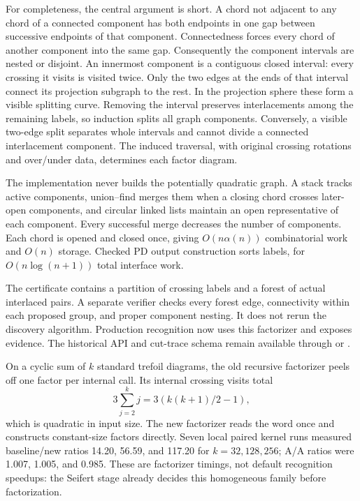 For completeness, the central argument is short. A chord not adjacent
to any chord of a connected component has both endpoints in one gap
between successive endpoints of that component. Connectedness forces
every chord of another component into the same gap. Consequently the
component intervals are nested or disjoint. An innermost component is
a contiguous closed interval: every crossing it visits is visited twice.
Only the two edges at the ends of that interval connect its projection
subgraph to the rest. In the projection sphere these form a visible
splitting curve. Removing the interval preserves interlacements among
the remaining labels, so induction splits all graph components.
Conversely, a visible two-edge split separates whole intervals and
cannot divide a connected interlacement component. The induced traversal,
with original crossing rotations and over/under data, determines each
factor diagram.

The implementation never builds the potentially quadratic graph. A stack
tracks active components, union--find merges them when a closing chord
crosses later-open components, and circular linked lists maintain an
open representative of each component. Every successful merge decreases
the number of components. Each chord is opened and closed once, giving
$O(n\alpha(n))$ combinatorial work and $O(n)$ storage. Checked PD output
construction sorts labels, for $O(n\log(n+1))$ total interface work.

The certificate contains a partition of crossing labels and a forest of
actual interlaced pairs. A separate verifier checks every forest edge,
connectivity within each proposed group, and proper component nesting.
It does not rerun the discovery algorithm. Production recognition now
uses this factorizer and exposes 
evidence. The historical API and cut-trace schema remain available
through  or .

On a cyclic sum of $k$ standard trefoil diagrams, the old recursive
factorizer peels off one factor per internal call. Its internal crossing
visits total
\[
 3\sum_{j=2}^k j=3\left(k(k+1)/2-1\right),
\]
which is quadratic in input size. The new factorizer reads the word once
and constructs constant-size factors directly. Seven local paired kernel
runs measured baseline/new ratios 14.20, 56.59, and 117.20 for $k=32,128,256$;
A/A ratios were 1.007, 1.005, and 0.985. These are factorizer timings,
not default recognition speedups: the Seifert stage already decides this
homogeneous family before factorization.

